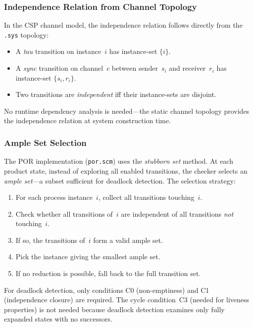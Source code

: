 \documentclass[11pt]{article}
\begin{document}
\subsubsection{Independence Relation from Channel Topology}

In the CSP channel model, the independence relation follows directly
from the \texttt{.sys} topology:
\begin{itemize}
\item A \emph{tau} transition on instance~$i$ has instance-set $\{i\}$.
\item A \emph{sync} transition on channel~$c$ between sender~$s_i$ and
  receiver~$r_i$ has instance-set $\{s_i, r_i\}$.
\item Two transitions are \emph{independent} iff their instance-sets
  are disjoint.
\end{itemize}

No runtime dependency analysis is needed---the static channel topology
provides the independence relation at system construction time.

\subsubsection{Ample Set Selection}

The POR implementation (\texttt{por.scm}) uses the \emph{stubborn set}
method.  At each product state, instead of exploring all enabled
transitions, the checker selects an \emph{ample set}---a subset
sufficient for deadlock detection.  The selection strategy:

\begin{enumerate}
\item For each process instance~$i$, collect all transitions touching~$i$.
\item Check whether all transitions of~$i$ are independent of all
  transitions \emph{not} touching~$i$.
\item If so, the transitions of~$i$ form a valid ample set.
\item Pick the instance giving the smallest ample set.
\item If no reduction is possible, fall back to the full transition set.
\end{enumerate}

For deadlock detection, only conditions C0 (non-emptiness) and C1
(independence closure) are required.  The cycle condition~C3 (needed
for liveness properties) is not needed because deadlock detection
examines only fully expanded states with no successors.
\end{document}
